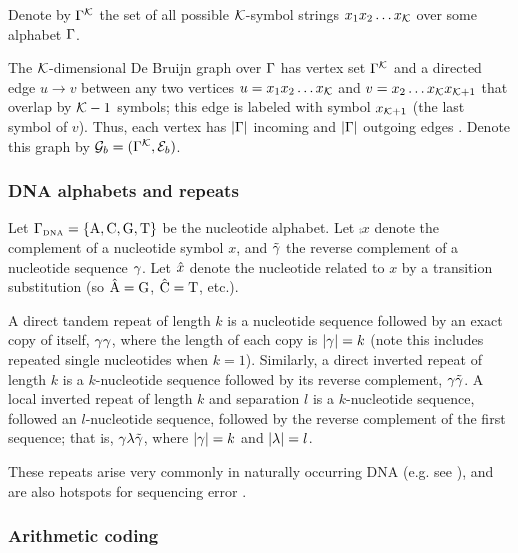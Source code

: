 \documentclass[english]{article}
\begin{document}
Denote by $\Gamma^{\cal K}$
the set of all possible ${\cal K}$-symbol strings
$x_1 x_2 \ldots x_{\cal K}$ over some alphabet $\Gamma$.

The ${\cal K}$-dimensional De Bruijn graph over $\Gamma$
has vertex set $\Gamma^{\cal K}$
and a directed edge $u \to v$ between any two vertices
$u=x_1 x_2 \ldots x_{\cal K}$ and $v=x_2 \ldots x_{\cal K} x_{{\cal K}+1}$
that overlap by ${\cal K}-1$ symbols; this edge is labeled with symbol $x_{{\cal K}+1}$ (the last symbol of $v$).
Thus, each vertex has $|\Gamma|$ incoming and $|\Gamma|$ outgoing edges \cite{DeBruijn1946,PevznerEtAl2001}.
Denote this graph by ${\cal G}_b = (\Gamma^{\cal K},{\cal E}_b)$.

\subsubsection{DNA alphabets and repeats}

Let $\Gamma_{\mbox{\tiny DNA}} = \{ \mbox{A}, \mbox{C}, \mbox{G}, \mbox{T} \} $ be the nucleotide alphabet.
Let $\comp{x}$ denote the complement of a nucleotide symbol $x$,
and $\tilde{\gamma}$ the reverse complement of a nucleotide sequence $\gamma$.
Let $\hat{x}$ denote the nucleotide related to $x$ by a transition substitution
(so $\hat{\mbox{A}} = \mbox{G}$, $\hat{\mbox{C}}=\mbox{T}$, etc.).

A direct tandem repeat of length $k$ is a nucleotide sequence followed by an exact copy of itself, $\gamma \gamma$, where the length of each copy is $|\gamma|=k$
(note this includes repeated single nucleotides when $k=1$).
Similarly, a direct inverted repeat of length $k$ is a $k$-nucleotide sequence followed by its reverse complement, $\gamma \tilde{\gamma}$.
A local inverted repeat of length $k$ and separation $l$ is a $k$-nucleotide sequence, followed an $l$-nucleotide sequence, followed by the reverse complement
of the first sequence; that is, $\gamma \lambda \tilde{\gamma}$, where $|\gamma|=k$ and $|\lambda|=l$.

These repeats arise very commonly in naturally occurring DNA (e.g. see \cite{Ellegren2004}),
and are also hotspots for sequencing error \cite{LaehnemannEtAl2016}.

\subsubsection{Arithmetic coding}
\end{document}
